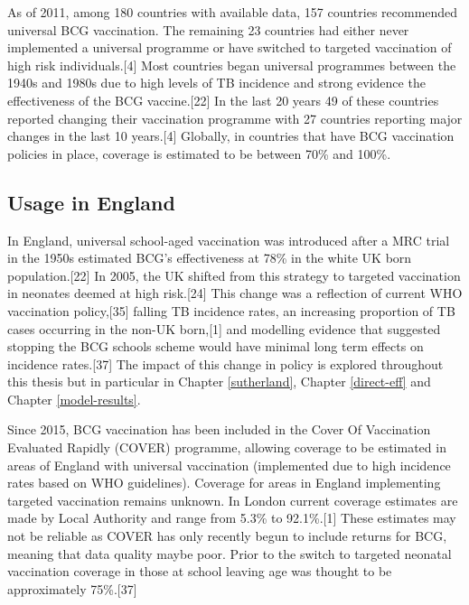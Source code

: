 \documentclass[11pt,twoside]{bristolthesis}
\begin{document}
  As of 2011, among 180 countries with available data, 157 countries recommended universal BCG vaccination. The remaining 23 countries had either never implemented a universal programme or have switched to targeted vaccination of high risk individuals.{[}4{]} Most countries began universal programmes between the 1940s and 1980s due to high levels of TB incidence and strong evidence the effectiveness of the BCG vaccine.{[}22{]} In the last 20 years 49 of these countries reported changing their vaccination programme with 27 countries reporting major changes in the last 10 years.{[}4{]} Globally, in countries that have BCG vaccination policies in place, coverage is estimated to be between 70\% and 100\%.
  
  \hypertarget{usage-in-england}{%
  \subsection{Usage in England}\label{usage-in-england}}
  
  In England, universal school-aged vaccination was introduced after a MRC trial in the 1950s estimated BCG's effectiveness at 78\% in the white UK born population.{[}22{]} In 2005, the UK shifted from this strategy to targeted vaccination in neonates deemed at high risk.{[}24{]} This change was a reflection of current WHO vaccination policy,{[}35{]} falling TB incidence rates, an increasing proportion of TB cases occurring in the non-UK born,{[}1{]} and modelling evidence that suggested stopping the BCG schools scheme would have minimal long term effects on incidence rates.{[}37{]} The impact of this change in policy is explored throughout this thesis but in particular in Chapter \ref{sutherland}, Chapter \ref{direct-eff} and Chapter \ref{model-results}.
  
  Since 2015, BCG vaccination has been included in the Cover Of Vaccination Evaluated Rapidly (COVER) programme, allowing coverage to be estimated in areas of England with universal vaccination (implemented due to high incidence rates based on WHO guidelines). Coverage for areas in England implementing targeted vaccination remains unknown. In London current coverage estimates are made by Local Authority and range from 5.3\% to 92.1\%.{[}1{]} These estimates may not be reliable as COVER has only recently begun to include returns for BCG, meaning that data quality maybe poor. Prior to the switch to targeted neonatal vaccination coverage in those at school leaving age was thought to be approximately 75\%.{[}37{]}
  
\end{document}
